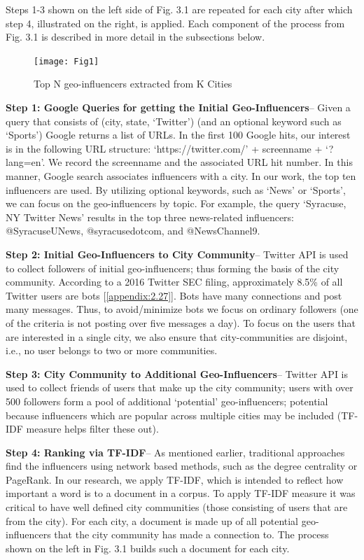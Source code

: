 Steps 1-3 shown on the left side of Fig. 3.1 are repeated for each city after which step 4, illustrated on the right, is applied. Each component of the process from Fig. 3.1 is described in more detail in the subsections below.

\begin{figure}[!t]
\centering
\texttt{[image: Fig1]}
\caption{Top N geo-influencers extracted from K Cities}
\label{fig_ch3_1}
\end{figure}

\noindent\textbf{Step 1: Google Queries for getting the Initial Geo-Influencers}-- Given a query that consists of (city, state, `Twitter') (and an optional keyword such as `Sports') Google returns a list of URLs. In the first 100 Google hits, our interest is in the following URL structure: `https://twitter.com/' + screenname + `?lang=en'. We record the screenname and the associated URL hit number. In this manner, Google search associates influencers with a city. In our work, the top ten influencers are used. By utilizing optional keywords, such as `News' or `Sports', we can focus on the geo-influencers by topic. For example, the query `Syracuse, NY Twitter News' results in the top three news-related influencers: @SyracuseUNews, @syracusedotcom, and @NewsChannel9. 

\noindent\textbf{Step 2: Initial Geo-Influencers to City Community}-- Twitter API is used to collect followers of initial geo-influencers; thus forming the basis of the city community. According to a 2016 Twitter SEC filing, approximately 8.5\% of all Twitter users are bots [\ref{appendix:2.27}]. Bots have many connections and post many messages. Thus, to avoid/minimize bots we focus on ordinary followers (one of the criteria is not posting over five messages a day). To focus on the users that are interested in a single city, we also ensure that city-communities are disjoint, i.e., no user belongs to two or more communities.  

\noindent\textbf{Step 3: City Community to Additional Geo-Influencers}-- Twitter API is used to collect friends of users that make up the city community; users with over 500 followers form a pool of additional `potential' geo-influencers; potential because influencers which are popular across multiple cities may be included (TF-IDF measure helps filter these out).

\noindent\textbf{Step 4: Ranking via TF-IDF}-- As mentioned earlier, traditional approaches find the influencers using network based methods, such as the degree centrality or PageRank. In our research, we apply TF-IDF, which is intended to reflect how important a word is to a document in a corpus. To apply TF-IDF measure it was critical to have well defined city communities (those consisting of users that are from the city). For each city, a document is made up of all potential geo-influencers that the city community has made a connection to. The process shown on the left in Fig. 3.1 builds such a document for each city.

